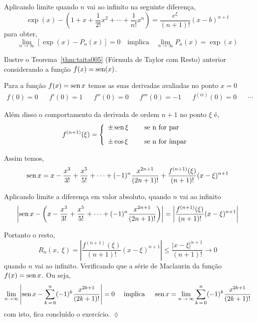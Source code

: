 Aplicando limite quando $n$ vai ao infinito na seguinte diferença,
\begin{equation*}
  \exp(x)-\left(1+x+\dfrac{1}{2!}x^2+\cdots+\dfrac{1}{n!}x^n\right)=\dfrac{e^{\xi}}{(n+1)!}(x-b)^{n+1}
\end{equation*}
para obter,
\begin{equation*}
  \lim_{n\to \infty}[\exp(x)-P_n(x)]=0\quad \text{implica} \quad \lim_{n\to \infty}P_n(x)=\exp(x)
\end{equation*}


\begin{exer}
Ilustre o Teorema~\ref{thm:taita005} (Fórmula de Taylor com Resto) anterior considerando a função $f(x)=\operatorname{sen}(x)$.
\end{exer}

\solo Para a função $f(x)=\operatorname{sen} x$ temos as suas derivadas avaliadas no ponto $x=0$
\begin{align*}
 f(0)=0 && f'(0)=1 && f''(0)=0 && f'''(0)=-1 && f^{(iv)}(0)=0 &&\cdots
\end{align*}

Além disso o comportamento da derivada de ordem $n+1$ no ponto $\xi$ é,
\begin{equation*}
  f^{(n+1)}(\xi)=\left\{
                   \begin{array}{ll}
                   \pm \operatorname{sen} \xi & \quad \hbox{ se n for par }  \\[2ex]
                     \pm \cos \xi & \quad \hbox{ se n for ímpar }
                   \end{array}
                 \right.
\end{equation*}

Assim temos,
\begin{equation*}
  \operatorname{sen} x=x-\dfrac{x^3}{3!}+\dfrac{x^5}{5!}+\cdots+(-1)^n\dfrac{x^{2n+1}}{(2n+1)!}
  +\dfrac{f^{(n+1)}(\xi)}{(n+1)!}(x-\xi)^{n+1}
\end{equation*}

Aplicando limite a diferença em valor absoluto, quando $n$ vai ao infinito
\begin{equation*}
\left|\operatorname{sen} x -\left(x-\dfrac{x^3}{3!}+\dfrac{x^5}{5!}+\cdots+(-1)^n\dfrac{x^{2n+1}}{(2n+1)!}\right)\right|=
\left|\dfrac{f^{(n+1)}(\xi)}{(n+1)!}(x-\xi)^{n+1}\right|
\end{equation*}

Portanto o resto,
\begin{equation*}
R_n(x,\; \xi)=\left|\dfrac{f^{(n+1)}(\xi)}{(n+1)!}(x-\xi)^{n+1}\right|\leq 
\dfrac{|x-\xi|^{n+1}}{(n+1)!} \to 0
\end{equation*}
quando $n$ vai ao infinito.  Verificando que a série de Maclaurin da função $f(x)=\operatorname{sen} x$. Ou seja,
\begin{equation*}
  \lim_{n\to \infty}\left|\operatorname{sen} x -\sum_{k\,=\,0}^{n}(-1)^k\frac{x^{2k+1}}{(2k+1)!}\right|=0\quad 
  \text{ implica }\quad
  \operatorname{sen} x=\lim_{n\, \to\, \infty}\sum_{k\,=\, 0}^{n}(-1)^k\frac{x^{2k+1}}{(2k+1)!}
\end{equation*}
 com isto, fica concluído o exercício. \hfill \(\lozenge\)

